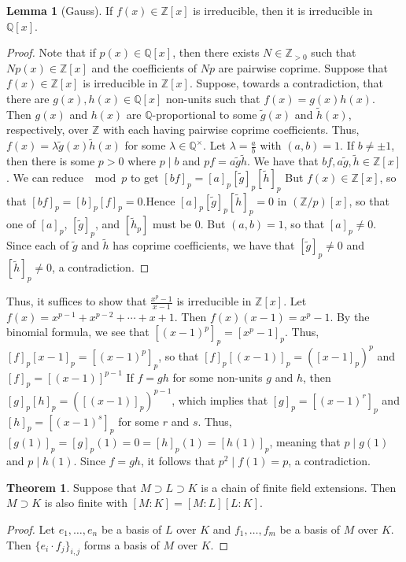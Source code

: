 \documentclass[10pt,letterpaper,cm]{nupset}
\theoremstyle{definition}
\theoremstyle{theorem}
\newtheorem{theorem}[definition]{Theorem}
\newtheorem{lemma}[definition]{Lemma}
\theoremstyle{remark}
\newcommand{\Q}{\mathbb Q}
\newcommand{\Z}{\mathbb Z}
\newcommand{\1}{\mathbf{1}}
\newcommand{\0}{\vec 0}
\begin{document}
\begin{lemma}[Gauss]
If $f(x) \in \Z[x]$ is irreducible, then it is irreducible in $\Q[x]$.
\end{lemma}
\begin{proof}
Note that if $p(x) \in \Q[x]$, then there exists $N \in \Z_{>0}$ such that $N p(x) \in \Z[x]$ and the coefficients  of $Np$ are pairwise coprime. Suppose that $f(x) \in \Z[x]$ is irreducible in $\Z[x]$. Suppose, towards a contradiction, that  there are $g(x), h(x)\in \Q[x]$ non-units such that $f(x) = g(x)h(x)$. Then $g(x)$ and $h(x)$ are $\Q$-proportional to some $\tilde{g}(x)$ and $\tilde{h}(x)$, respectively, over $\Z$ with each having pairwise coprime coefficients. Thus, $f(x) = \lambda \tilde{g}(x)\tilde{h}(x)$ for some $\lambda \in \Q^{\times}$. Let $\lambda = \frac{a}{b}$ with $(a,b)=1$. If $b \ne \pm 1$, then there is some $p>0$ where $p \mid b$ and $pf = a \tilde{g}\tilde{h}$. We have that $bf, a \tilde{g}, \tilde{h} \in \Z[x]$. We can reduce $\mod p$ to get $[bf]_p = [a]_p[\tilde{g}]_p[\tilde{h}]_p$ But $f(x) \in \Z[x]$, so that $[bf]_p  = [b]_p[f]_p =0$.Hence $[a]_p[\tilde{g}]_p[\tilde{h}]_p =0$ in $(\Z/p)[x]$, so that one of $[a]_p$, $[\tilde{g}]_p$, and $[\tilde{h}_p]$ must be $0$. But $(a,b) =1$, so that $[a]_p \ne 0$. Since each of $\tilde{g}$ and $\tilde{h}$ has coprime coefficients, we have that $[\tilde{g}]_p \ne 0$ and $[\tilde{h}]_p \ne 0$, a contradiction. 
\end{proof}

Thus, it suffices to show that $\frac{x^p-1}{x-1}$  is irreducible in $\Z[x]$. Let $f(x) = x^{p-1} + x^{p-2} + \cdots + x + 1$. Then $f(x) (x-1) = x^p-1$. By the binomial formula, we see that $[(x-1)^p]_p = [x^p-1]_p$. Thus, $[f]_p[x-1]_p = [(x-1)^p]_p$, so that $[f]_p[(x-1)]_p = ([x-1]_p)^p$ and $[f]_p = [(x-1)]^{p-1}$ If $f=gh$ for some non-units $g$ and $h$, then $[g]_p[h]_p = \left([(x-1)]_p\right)^{p-1}$, which implies that $[g]_p = [(x-1)^r]_p$ and $[h]_p = [(x-1)^s]_p$ for some $r$ and $s$. Thus, $[g(1)]_p = [g]_p(1) = 0 = [h]_p(1)= [h(1)]_p$, meaning that $p\mid g(1)$ and $p\mid h(1)$. Since $f=gh$, it follows that $p^2 \mid f(1) =p$, a contradiction.

\smallskip

\begin{theorem}\label{lt}
Suppose that $M \supset L \supset K$ is a chain of finite field extensions. Then $M \supset K$ is also finite with $[M:K] = [M:L][L:K]$.
\end{theorem}
\begin{proof}
Let $e_1, \ldots, e_n$ be a basis of $L$ over $K$ and $f_1, \ldots, f_m$ be a basis of $M$ over $K$. Then $\{e_i\cdot f_j\}_{i,j}$ forms a basis of $M$ over $K$.
\end{proof}
\end{document}

